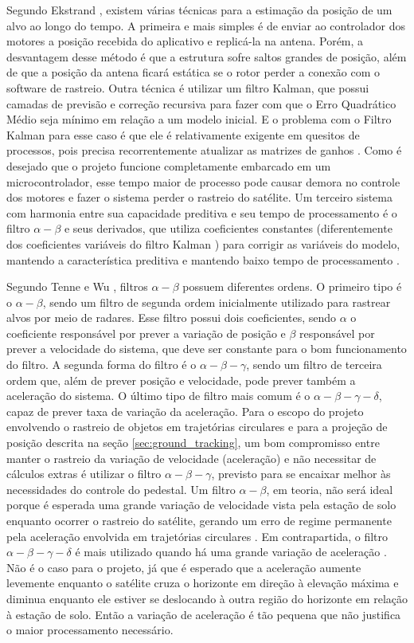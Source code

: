 Segundo Ekstrand \citeyear{ekstrand2012}, existem várias técnicas para a estimação da posição de um alvo ao longo do tempo. A primeira e mais simples é de enviar ao controlador dos motores a posição recebida do aplicativo e replicá-la na antena. Porém, a desvantagem desse método é que a estrutura sofre saltos grandes de posição, além de que a posição da antena ficará estática se o rotor perder a conexão com o software de rastreio.
Outra técnica é utilizar um filtro Kalman, que possui camadas de previsão e correção recursiva para fazer com que o Erro Quadrático Médio seja mínimo em relação a um modelo inicial. E o problema com o Filtro Kalman para esse caso é que ele é relativamente exigente em quesitos de processos, pois precisa recorrentemente atualizar as matrizes de ganhos \cite{ekstrand2012}.
Como é desejado que o projeto funcione completamente embarcado em um microcontrolador, esse tempo maior de processo pode causar demora no controle dos motores e fazer o sistema perder o rastreio do satélite. Um terceiro sistema com harmonia entre sua capacidade preditiva e seu tempo de processamento é o filtro $\alpha-\beta$ e seus derivados, que utiliza coeficientes constantes (diferentemente dos coeficientes variáveis do filtro Kalman \cite{ekstrand2012}) para corrigir as variáveis do modelo, mantendo a característica preditiva e mantendo baixo tempo de processamento \cite{wu2009}.

Segundo Tenne \citeyear{tenne2000} e Wu \citeyear{wu2009}, filtros $\alpha-\beta$ possuem diferentes ordens. O primeiro tipo é o $\alpha-\beta$, sendo um filtro de segunda ordem inicialmente utilizado para rastrear alvos por meio de radares. Esse filtro possui dois coeficientes, sendo $\alpha$ o coeficiente responsável por prever a variação de posição e $\beta$ responsável por prever a velocidade do sistema, que deve ser constante para o bom funcionamento do filtro.
A segunda forma do filtro é o $\alpha-\beta-\gamma$, sendo um filtro de terceira ordem que, além de prever posição e velocidade, pode prever também a aceleração do sistema. O último tipo de filtro mais comum é o $\alpha-\beta-\gamma-\delta$, capaz de prever taxa de variação da aceleração.
Para o escopo do projeto envolvendo o rastreio de objetos em trajetórias circulares e para a projeção de posição descrita na seção \ref{sec:ground_tracking}, um bom compromisso entre manter o rastreio da variação de velocidade (aceleração) e não necessitar de cálculos extras é utilizar o filtro $\alpha-\beta-\gamma$, previsto para se encaixar melhor às necessidades do controle do pedestal.
Um filtro $\alpha-\beta$, em teoria, não será ideal porque é esperada uma grande variação de velocidade vista pela estação de solo enquanto ocorrer o rastreio do satélite, gerando um erro de regime permanente pela aceleração envolvida em trajetórias circulares \cite{tenne2000}.
Em contrapartida, o filtro $\alpha-\beta-\gamma-\delta$ é mais utilizado quando há uma grande variação de aceleração \cite{wu2009}. Não é o caso para o projeto, já que é esperado que a aceleração aumente levemente enquanto o satélite cruza o horizonte em direção à elevação máxima e diminua enquanto ele estiver se deslocando à outra região do horizonte em relação à estação de solo. Então a variação de aceleração é tão pequena que não justifica o maior processamento necessário.

